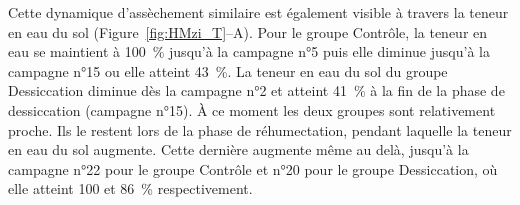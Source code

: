 Cette dynamique d'assèchement similaire est également visible à travers la teneur en eau du sol (Figure~\ref{fig:HMzi_T}--A).
Pour le groupe Contrôle, la teneur en eau se maintient à \SI{100}{\percent} jusqu'à la campagne n°5 puis elle diminue jusqu'à la campagne n°15 ou elle atteint \SI{43}{\percent}.
La teneur en eau du sol du groupe Dessiccation diminue dès la campagne n°2 et atteint \SI{41}{\percent} à la fin de la phase de dessiccation (campagne n°15).
À ce moment les deux groupes sont relativement proche.
Ils le restent lors de la phase de réhumectation, pendant laquelle la teneur en eau du sol augmente.
Cette dernière augmente même au delà, jusqu'à la campagne n°22 pour le groupe Contrôle et n°20 pour le groupe Dessiccation, où elle atteint 100 et \SI{86}{\percent} respectivement.


